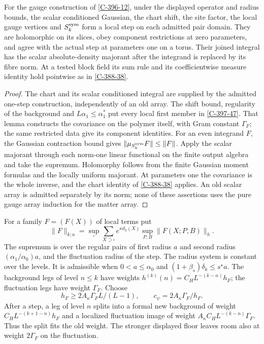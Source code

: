 \documentclass[11pt,letterpaper,reqno]{amsart}
\makeatletter
\theoremstyle{definition}
\newcommand{\ms@minorstart}{%
  \pushQED{\qed}\renewcommand{\qedsymbol}{$\blacksquare$}}
\newenvironment{proposition}[1][]{\ms@minorstart\ms@proposition[#1]}
  {\popQED\endms@proposition}
\theoremstyle{remark}
\makeatother
\begin{document}
\begin{proposition}[The objects of a local step]\label{C-388-34}
For the gauge construction of \cref{C-396-12}, under the displayed operator and
radius bounds, the scalar conditioned Gaussian, the chart
shift, the site factor, the local gauge vertices and
$S_k^{\rm sym}$ form a local step on each admitted pair
domain.  They are holomorphic on its slices, obey component
restrictions at zero parameters, and agree with the actual
step at parameters one on a torus.  Their joined integral
has the scalar absolute-density majorant after the integrand
is replaced by its fibre norm.  At a tested block field its
sum rule and its coefficientwise measure identity hold
pointwise as in \cref{C-388-38}.
\end{proposition}
\begin{proof}
The chart and its scalar conditioned integral are supplied
by the admitted one-step construction, independently of an
old array.  The shift bound, regularity of the background
and $L\alpha_1\le\alpha_1^*$ put every local first member
in \cref{C-397-47}.  That lemma constructs the covariance
on the polymer itself, with Gram constant $\Gamma_F$;
the same restricted data give its component identities.
For an even integrand $F$, the Gaussian contraction bound
gives $\|\mu_{S_k^{\rm sym}}F\|\le\|F\|$.
Apply the scalar majorant through each norm-one linear
functional on the finite output algebra and take the
supremum.  Holomorphy follows from the finite Gaussian
moment formulas and the locally uniform majorant.
At parameters one the covariance is the whole inverse,
and the chart identity of \cref{C-388-38} applies.
An old scalar array is admitted separately by its norm;
none of these assertions uses the pure gauge array
induction for the matter array.
\end{proof}

For a family $F=(F(X))$ of local terms put
\[
 \|F\|_{k;a}=\sup_\square\sum_{X\supset\square}
 e^{\kappa d_k(X)}\sup_{P,B}\|F(X;P,B)\|_h.
\]
The supremum is over the regular pairs of first radius $a$ and
second radius $(\alpha_1/\alpha_0)a$, and the fluctuation radius
of the step.  The radius system is constant over the levels.
It is admissible when
$0<a\le\alpha_0$ and $(1+\beta_s)\delta_k\le s^\star a$.
The background legs of level $n\le k$ have weights
$h^{(k)}(n)=C_HL^{-(k-n)}h_F$; the fluctuation legs have weight
$\Gamma_F$.  Choose
\[
 h_F\ge2A_\kappa\Gamma_F L/(L-1),\qquad
 c_\psi=2A_\kappa\Gamma_F/h_F.
\]
After a step, a leg of level $n$ splits into a formal new
background of weight $C_HL^{-(k+1-n)}h_F$ and a localized
fluctuation image of weight
$A_\kappa C_HL^{-(k-n)}\Gamma_F$.  Thus the split fits the old
weight.  The stronger displayed floor leaves room also at weight
$2\Gamma_F$ on the fluctuation.
\end{document}
